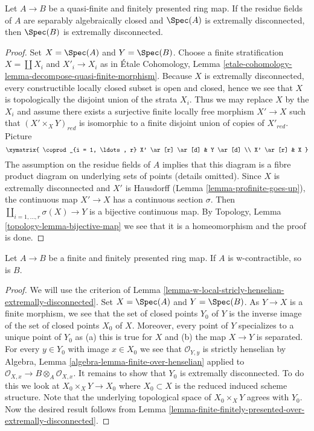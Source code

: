\begin{lemma}
\label{lemma-finite-finitely-presented-over-extremally-disconnected}
Let $A \to B$ be a quasi-finite and finitely presented ring map.
If the residue fields of $A$ are separably algebraically closed
and $\Spec(A)$ is extremally disconnected, then $\Spec(B)$ is
extremally disconnected.
\end{lemma}

\begin{proof}
Set $X = \Spec(A)$ and $Y = \Spec(B)$. Choose a finite stratification
$X = \coprod X_i$ and $X'_i \to X_i$ as in
\'Etale Cohomology, Lemma
\ref{etale-cohomology-lemma-decompose-quasi-finite-morphism}.
Because $X$ is extremally disconnected, every constructible
locally closed subset is open and closed, hence we see that $X$
is topologically the disjoint union of the strata $X_i$. Thus we may
replace $X$ by the $X_i$ and assume there exists a surjective finite
locally free morphism $X' \to X$ such that $(X' \times_X Y)_{red}$
is isomorphic to a finite disjoint union of copies of $X'_{red}$.
Picture
$$
\xymatrix{
\coprod_{i = 1, \ldots, r} X' \ar[r] \ar[d] & Y \ar[d] \\
X' \ar[r] & X
}
$$
The assumption on the residue fields of $A$ implies that
this diagram is a fibre product diagram on underlying sets
of points (details omitted).
Since $X$ is extremally disconnected and $X'$ is Hausdorff
(Lemma \ref{lemma-profinite-goes-up}), the continuous map
$X' \to X$ has a continuous section $\sigma$. Then
$\coprod_{i = 1, \ldots, r} \sigma(X) \to Y$ is a bijective
continuous map. By
Topology, Lemma \ref{topology-lemma-bijective-map}
we see that it is a homeomorphism and the proof is done.
\end{proof}

\begin{lemma}
\label{lemma-finite-finitely-presented-over-w-contractible}
Let $A \to B$ be a finite and finitely presented ring map.
If $A$ is w-contractible, so is $B$.
\end{lemma}

\begin{proof}
We will use the criterion of
Lemma \ref{lemma-w-local-stricly-henselian-extremally-disconnected}.
Set $X = \Spec(A)$ and $Y = \Spec(B)$.
As $Y \to X$ is a finite morphism, we see that the set of closed
points $Y_0$ of $Y$ is the inverse image of the set of closed points
$X_0$ of $X$. Moreover, every point of $Y$ specializes to a unique
point of $Y_0$ as (a) this is true for $X$ and (b) the map
$X \to Y$ is separated. For every $y \in Y_0$ with image $x \in X_0$
we see that $\mathcal{O}_{Y, y}$ is strictly henselian by
Algebra, Lemma \ref{algebra-lemma-finite-over-henselian}
applied to $\mathcal{O}_{X, x} \to B \otimes_A \mathcal{O}_{X, x}$.
It remains to show that $Y_0$ is extremally disconnected.
To do this we look at $X_0 \times_X Y \to X_0$
where $X_0 \subset X$ is the reduced induced scheme structure.
Note that the underlying topological space of
$X_0 \times_X Y$ agrees with $Y_0$. Now the desired result follows from
Lemma \ref{lemma-finite-finitely-presented-over-extremally-disconnected}.
\end{proof}

